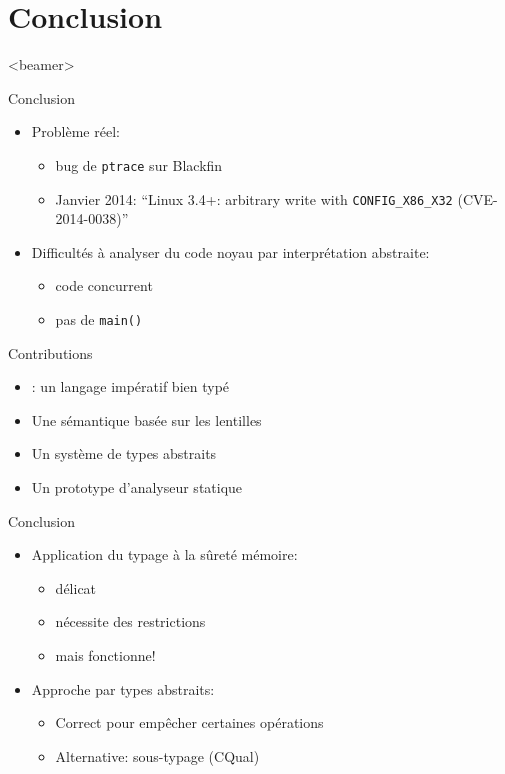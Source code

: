 \section{Conclusion}
  \begin{frame}<beamer>
   \tableofcontents[currentsection]
 \end{frame}


\begin{frame}{Conclusion}
    \begin{itemize}
    \item Problème réel:
        \begin{itemize}
            \item bug de \texttt{ptrace} sur Blackfin
            \item Janvier 2014:
                \enquote{Linux 3.4+: arbitrary write with \texttt{CONFIG\_X86\_X32} (CVE-2014-0038)}
        \end{itemize}
    \item Difficultés à analyser du code noyau par interprétation abstraite:
        \begin{itemize}
            \item code concurrent
            \item pas de \texttt{main()}
        \end{itemize}
    \end{itemize}
\end{frame}

\begin{frame}{Contributions}
\begin{itemize}
\item \langname: un langage impératif bien typé
\item Une sémantique basée sur les lentilles
\item Un système de types abstraits
\item Un prototype d'analyseur statique
\end{itemize}
\end{frame}

\begin{frame}{Conclusion}
    \begin{itemize}
    \item Application du typage à la sûreté mémoire:
        \begin{itemize}
            \item délicat
            \item nécessite des restrictions
            \item mais fonctionne!
        \end{itemize}
    \item Approche par types abstraits:
        \begin{itemize}
            \item Correct pour empêcher certaines opérations
            \item Alternative: sous-typage (CQual)
        \end{itemize}
    \end{itemize}
\end{frame}

